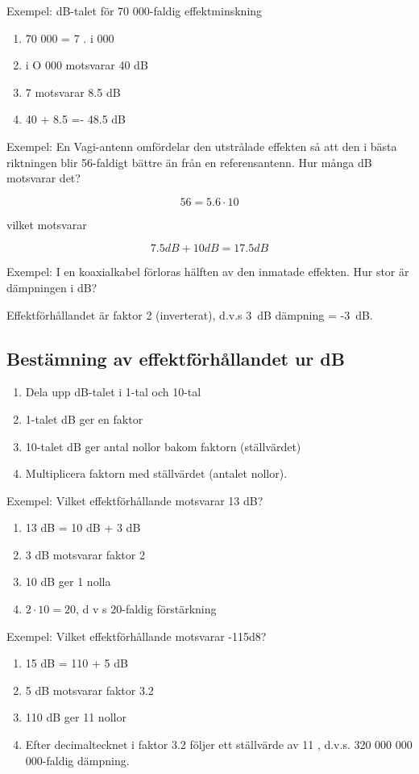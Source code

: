 Exempel: dB-talet för 70 000-faldig effektminskning
\begin{enumerate}
\item 70 000 = 7 . i 000
\item i O 000 motsvarar 40 dB
\item 7 motsvarar 8.5 dB
\item 40 + 8.5 =- 48.5 dB
\end{enumerate}

Exempel: En Vagi-antenn omfördelar den utstrålade effekten så att den
i bästa riktningen blir 56-faldigt bättre än från en
referensantenn. Hur många dB motsvarar det?

\[ 56 = 5.6 \cdot 10\]

vilket motsvarar

\[ 7.5 dB + 10 dB = 17.5 dB\]

Exempel: I en koaxialkabel förloras hälften av den inmatade
effekten. Hur stor är dämpningen i dB?

Effektförhållandet är faktor 2 (inverterat), d.v.s 3~dB dämpning =
-3~dB.

\subsection{Bestämning av effektförhållandet ur dB}

\begin{enumerate}
\item Dela upp dB-talet i 1-tal och 10-tal
\item 1-talet dB ger en faktor
\item 10-talet dB ger antal nollor bakom faktorn (ställvärdet)
\item Multiplicera faktorn med ställvärdet (antalet nollor).
\end{enumerate}

Exempel: Vilket effektförhållande motsvarar 13 dB?

\begin{enumerate}
\item 13 dB = 10 dB + 3 dB
\item 3 dB motsvarar faktor 2
\item 10 dB ger 1 nolla
\item \(2 \cdot 10 = 20\), d v s 20-faldig förstärkning
\end{enumerate}

Exempel: Vilket effektförhållande motsvarar -115d8?
\begin{enumerate}
\item 15 dB = 110 + 5 dB
\item 5 dB motsvarar faktor 3.2
\item 110 dB ger 11 nollor
\item Efter decimaltecknet i faktor 3.2 följer ett ställvärde av 11 ,
  d.v.s. 320 000 000 000-faldig dämpning.
\end{enumerate}


